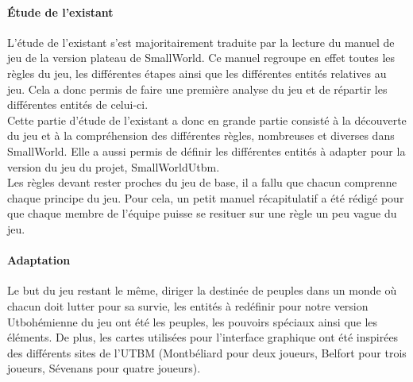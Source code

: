 \documentclass[a4paper, 11pt]{article}
\begin{document}
		\paragraph{Étude de l'existant\\}		
		L'étude de l'existant s'est majoritairement traduite par la lecture du manuel de jeu de la version plateau de SmallWorld. Ce manuel regroupe en effet toutes les règles du jeu, les différentes étapes ainsi que les différentes entités relatives au jeu. Cela a donc permis de faire une première analyse du jeu et de répartir les différentes entités de celui-ci. \\
		Cette partie d'étude de l'existant a donc en grande partie consisté à la découverte du jeu et à la compréhension des différentes règles, nombreuses et diverses dans SmallWorld. Elle a aussi permis de définir les différentes entités à adapter pour la version du jeu du projet, SmallWorldUtbm. \\
		Les règles devant rester proches du jeu de base, il a fallu que chacun comprenne chaque principe du jeu. Pour cela, un petit manuel récapitulatif a été rédigé pour que chaque membre de l'équipe puisse se resituer sur une règle un peu vague du jeu. \\
		
		\paragraph{Adaptation\\}
		Le but du jeu restant le même, diriger la destinée de peuples dans un monde où chacun doit lutter pour sa survie, les entités à redéfinir pour notre version Utbohémienne du jeu ont été les peuples, les pouvoirs spéciaux ainsi que les éléments. De plus, les cartes utilisées pour l'interface graphique ont été inspirées des différents sites de l'UTBM (Montbéliard pour deux joueurs, Belfort pour trois joueurs, Sévenans pour quatre joueurs).
		
\end{document}
